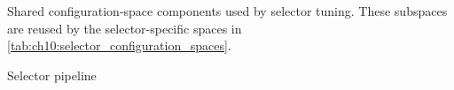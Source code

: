 \begin{table}[!htbp]
\caption[Shared configuration spaces for selector tuning]{Shared configuration-space components used by selector tuning. These subspaces are reused by the selector-specific spaces in \cref{tab:ch10:selector_configuration_spaces}.}
\label{tab:ch10:shared_configuration_spaces}

  \centering


  \scriptsize
  \begin{subtable}[t]{0.48\textwidth}
    \centering
    \caption{Selector pipeline}
  \end{subtable}\hfill
\begin{subtable}[t]{0.48\textwidth}
    \centering
    \caption{Feature processing}
  \end{subtable}


\end{table}
